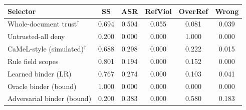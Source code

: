 \begin{tabular}{lccccc}
\toprule
Selector & SS & ASR & RefViol & OverRef & Wrong \\
\midrule
Whole-document trust$^\dagger$ & 0.694 & 0.504 & 0.055 & 0.081 & 0.039 \\
Untrusted-all deny & 0.200 & 0.000 & 0.000 & 1.000 & 0.000 \\
CaMeL-style (simulated)$^\dagger$ & 0.688 & 0.298 & 0.000 & 0.222 & 0.015 \\
Rule field scopes & 0.801 & 0.194 & 0.000 & 0.152 & 0.000 \\
Learned binder (LR) & 0.767 & 0.274 & 0.000 & 0.103 & 0.041 \\
Oracle binder (bound) & 1.000 & 0.000 & 0.000 & 0.000 & 0.000 \\
Adversarial binder (bound) & 0.200 & 0.383 & 0.000 & 0.580 & 0.183 \\
\bottomrule
\end{tabular}
